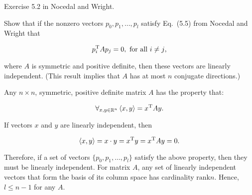 \begin{problem}
  Exercise 5.2 in Nocedal and Wright.

  Show that if the nonzero vectors $p_0,p_1,\ldots,p_l$ satisfy Eq.~(5.5) from Nocedal and Wright that
  
  \[p_i^{\textnormal{T}} A p_{j} = 0, \textnormal{ for all } i \ne j\text{,}\]
  
  \noindent
  where $A$ is symmetric and positive definite, then these vectors are linearly independent. (This result implies that $A$ has at most $n$ conjugate directions.)
\end{problem}

Any $n\times n$, symmetric, positive definite matrix $A$ has the property that:

\[ \forall_{x,y\in \mathbb{R}^n} \left<x,y\right> = x^{\textnormal{T}} A y \text{.} \]

\noindent
If vectors $x$ and $y$ are linearly independent, then 

\[ \left<x,y\right> = x \cdot y= x^{\textnormal{T}} y = x^{\textnormal{T}} A y = 0\text{.} \]

\noindent
Therefore, if a set of vectors $\{p_{0},p_{1},\ldots,p_{l}\}$ satisfy the above property, then they must be linearly independent.  For matrix $A$, any set of linearly independent vectors that form the basis of its column space has cardinality $\text{rank} n$. Hence, ${l \leq n -1}$ for any $A$.

